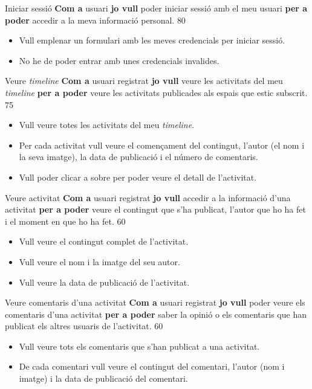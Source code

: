 
\bgroup
\def\arraystretch{1.5}

\pintaHistoria
    {Iniciar sessió}
    {\textbf{Com a} usuari \textbf{jo vull} poder iniciar sessió amb el meu usuari \textbf{per a poder} accedir a la meva informació personal.}
    {80}
    {
    \begin{itemize}[leftmargin=0.3cm]
        \item Vull emplenar un formulari amb les meves credencials per iniciar sessió.
        \item No he de poder entrar amb unes credencials invalides.
    \end{itemize}
    }

\pintaHistoria
    {Veure \textit{timeline}}
    {\textbf{Com a} usuari registrat \textbf{jo vull} veure les activitats del meu \textit{timeline} \textbf{per a poder} veure les activitats publicades als espais que estic subscrit.}
    {75}
    {
    \begin{itemize}[leftmargin=0.3cm]
        \item Vull veure totes les activitats del meu \textit{timeline}.
        \item Per cada activitat vull veure el començament del contingut, l'autor (el nom i la seva imatge), la data de publicació i el número de comentaris.
        \item Vull poder clicar a sobre per poder veure el detall de l'activitat.
    \end{itemize}
    }

\pintaHistoria
    {Veure activitat}
    {\textbf{Com a} usuari registrat \textbf{jo vull} accedir a la informació d'una activitat \textbf{per a poder} veure el contingut que s'ha publicat, l'autor que ho ha fet i el moment en que ho ha fet.}
    {60}
    {
    \begin{itemize}[leftmargin=0.3cm]
        \item Vull veure el contingut complet de l'activitat.
        \item Vull veure el nom i la imatge del seu autor.
        \item Vull veure la data de publicació de l'activitat.
    \end{itemize}
    }

    
\pintaHistoria
    {Veure comentaris d'una activitat}
    {\textbf{Com a} usuari registrat \textbf{jo vull} poder veure els comentaris d'una activitat \textbf{per a poder} saber la opinió o els comentaris que han publicat els altres usuaris de l'activitat.}
    {60}
    {
    \begin{itemize}[leftmargin=0.3cm]
        \item Vull veure tots els comentaris que s'han publicat a una activitat.
        \item De cada comentari vull veure el contingut del comentari, l'autor (nom i imatge) i la data de publicació del comentari.
    \end{itemize}
    }
    
